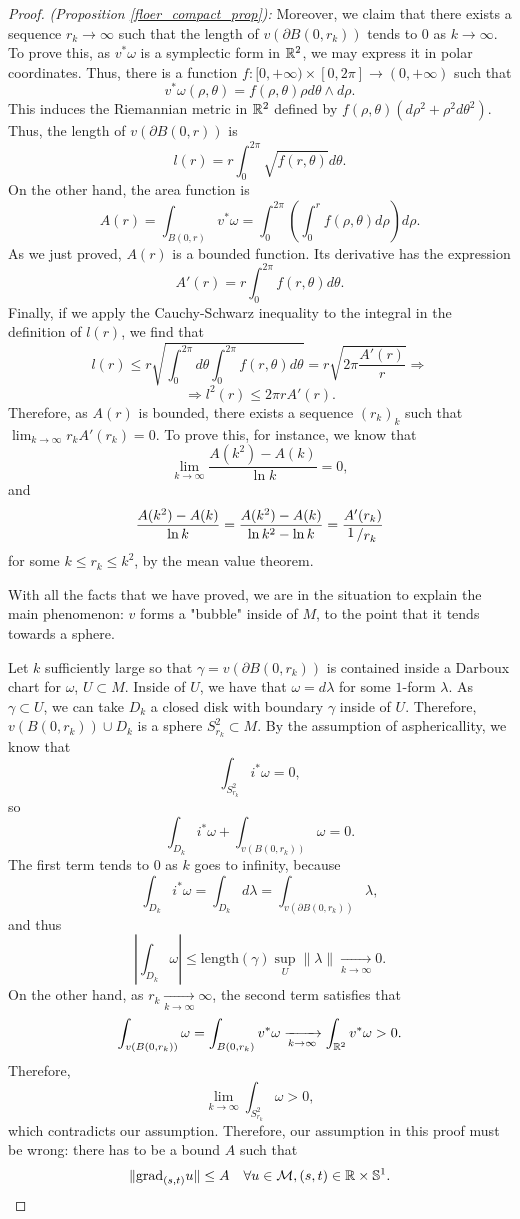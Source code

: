 \begin{proof} {\it (Proposition \ref{floer_compact_prop}):}
Moreover, we claim that there exists a sequence $r_k \rightarrow \infty$ such that the length of $v(\partial B(0,r_k))$ tends to $0$ as $k \rightarrow \infty$. To prove this, as $v^{\ast} \omega$ is a symplectic form in $\mathbb{R}^2$, we may express it in polar coordinates. Thus, there is a function $f : [0,+\infty) \times [0,2\pi] \rightarrow (0,+\infty)$ such that
\[v^{\ast} \omega(\rho,\theta) = f(\rho,\theta) \rho d \theta \wedge d \rho .\]
This induces the Riemannian metric in $\mathbb{R}^2$ defined by $f(\rho,\theta)(d\rho^2 + \rho^2 d\theta^2)$. Thus, the length of $v(\partial B(0,r))$ is
\[l(r) = r \int_0^{2\pi} \sqrt{f(r,\theta)} d \theta .\]
On the other hand, the area function is
\[A(r) = \int_{B(0,r)} v^{\ast} \omega = \int_0^{2\pi} \left( \int_0^r f(\rho,\theta) d\rho \right) d\rho .\]
As we just proved, $A(r)$ is a bounded function. Its derivative has the expression
\[A'(r) = r \int_0^{2\pi} f(r,\theta) d\theta .\]
Finally, if we apply the Cauchy-Schwarz inequality to the integral in the definition of $l(r)$, we find that
\[l(r) \leq r \sqrt{\int_0^{2\pi} d\theta \int_0^{2\pi} f(r,\theta) d\theta} = r \sqrt{2\pi \frac{A'(r)}{r}}  \Rightarrow\]
\[\Rightarrow l^2(r) \leq 2\pi r A'(r) .\]
Therefore, as $A(r)$ is bounded, there exists a sequence $(r_k)_k$ such that $\displaystyle\lim_{k\rightarrow \infty} r_k A'(r_k) = 0$. To prove this, for instance, we know that
\[\lim_{k \rightarrow \infty} \frac{A(k^2) - A(k)}{\ln k} = 0 ,\]
and
\[\frac{A(k^2)-A(k)}{\ln k} = \frac{A(k^2)-A(k)}{\ln k^2 - \ln k} = \frac{A'(r_k)}{\quocient{1}{r_k}}\]
for some $k \leq r_k \leq k^2$, by the mean value theorem.

With all the facts that we have proved, we are in the situation to explain the main phenomenon: $v$ forms a "bubble" inside of $M$, to the point that it tends towards a sphere.

Let $k$ sufficiently large so that $\gamma = v(\partial B(0,r_k))$ is contained inside a Darboux chart for $\omega$, $U \subset M$. Inside of $U$, we have that $\omega = d\lambda$ for some $1$-form $\lambda$. As $\gamma \subset U$, we can take $D_k$ a closed disk with boundary $\gamma$ inside of $U$. Therefore, $v(B(0,r_k)) \cup D_k$ is a sphere $S_{r_k}^2 \subset M$. By the assumption of asphericallity, we know that
\[\int_{S_{r_k}^2} i^{\ast} \omega = 0 ,\]
so
\[\int_{D_k} i^{\ast} \omega + \int_{v(B(0,r_k))} \omega = 0 .\]
The first term tends to $0$ as $k$ goes to infinity, because
\[\int_{D_k} i^{\ast} \omega = \int_{D_k} d\lambda = \int_{v(\partial B(0,r_k))} \lambda ,\]
and thus
\[\left| \int_{D_k} \omega \right| \leq \text{length}(\gamma) \sup_U\|\lambda\| \xrightarrow[k \rightarrow \infty]{} 0 .\]
On the other hand, as $r_k \xrightarrow[k \rightarrow \infty]{} \infty$, the second term satisfies that
\[\int_{v(B(0,r_k))} \omega = \int_{B(0,r_k)} v^{\ast} \omega \xrightarrow[k \rightarrow \infty]{} \int_{\mathbb{R}^2} v^{\ast} \omega > 0 .\]
Therefore,
\[\lim_{k \rightarrow \infty} \int_{S_{r_k}^2} \omega > 0,\]
which contradicts our assumption. Therefore, our assumption in this proof must be wrong: there has to be a bound $A$ such that
\[\|\grad_{(s,t)}u\| \leq A \ \ \ \forall u \in \mathcal{M}, (s,t) \in \R \times \con{S}^1 .\]
\end{proof}

